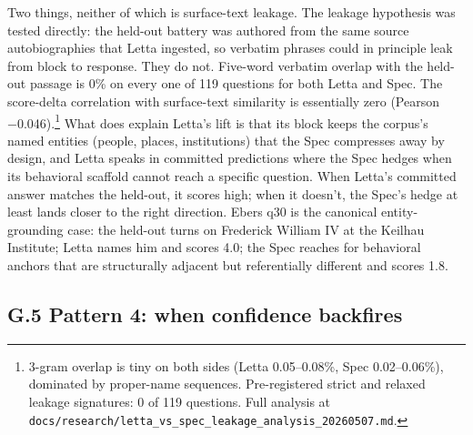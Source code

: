 Two things, neither of which is surface-text leakage. The leakage
hypothesis was tested directly: the held-out battery was authored from
the same source autobiographies that Letta ingested, so verbatim phrases
could in principle leak from block to response. They do not. Five-word
verbatim overlap with the held-out passage is 0\% on every one of 119
questions for both Letta and Spec. The score-delta correlation with
surface-text similarity is essentially zero (Pearson −0.046).\footnote{3-gram
  overlap is tiny on both sides (Letta 0.05--0.08\%, Spec 0.02--0.06\%),
  dominated by proper-name sequences. Pre-registered strict and relaxed
  leakage signatures: 0 of 119 questions. Full analysis at
  \texttt{docs/research/letta\_vs\_spec\_leakage\_analysis\_20260507.md}.}
What does explain Letta's lift is that its block keeps the corpus's
named entities (people, places, institutions) that the Spec compresses
away by design, and Letta speaks in committed predictions where the Spec
hedges when its behavioral scaffold cannot reach a specific question.
When Letta's committed answer matches the held-out, it scores high; when
it doesn't, the Spec's hedge at least lands closer to the right
direction. Ebers q30 is the canonical entity-grounding case: the
held-out turns on Frederick William IV at the Keilhau Institute; Letta
names him and scores 4.0; the Spec reaches for behavioral anchors that
are structurally adjacent but referentially different and scores 1.8.

\hypertarget{g.5-pattern-4-when-confidence-backfires}{%
\subsection{G.5 Pattern 4: when confidence
backfires}\label{g.5-pattern-4-when-confidence-backfires}}

